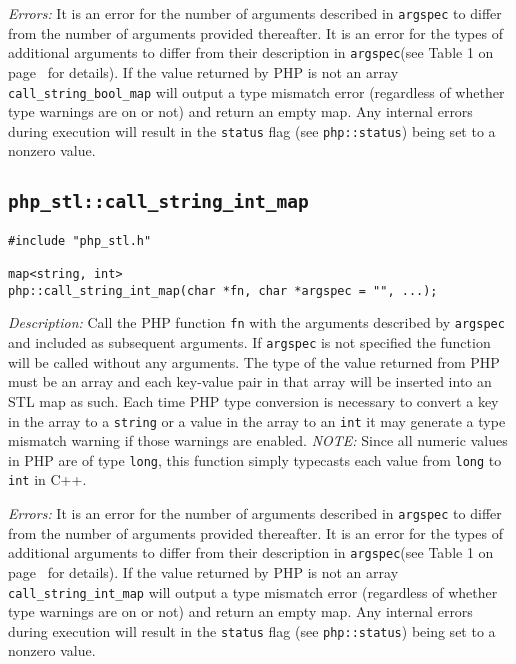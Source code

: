 \documentclass[11pt,titlepage]{article}
\begin{document}
\emph{Errors:} It is an error for the number of arguments described in \verb|argspec| to differ from the number of arguments provided thereafter. It is an error for the types of additional arguments to differ from their description in \verb|argspec|(see Table 1 on page~\pageref{Table1} for details). If the value returned by PHP is not an array \verb|call_string_bool_map| will output a type mismatch error (regardless of whether type warnings are on or not) and return an empty map. Any internal errors during execution will result in the \verb|status| flag (see \verb|php::status|) being set to a nonzero value.


\subsection{\texttt{php\_stl::call\_string\_int\_map}}

\begin{verbatim}
#include "php_stl.h"

map<string, int> 
php::call_string_int_map(char *fn, char *argspec = "", ...);
\end{verbatim}

\emph{Description:} Call the PHP function \verb|fn| with the arguments described by \verb|argspec| and included as subsequent arguments. If \verb|argspec| is not specified the function will be called without any arguments. The type of the value returned from PHP must be an array and each key-value pair in that array will be inserted into an STL map as such. Each time PHP type conversion is necessary to convert a key in the array to a \verb|string| or a value in the array to an \verb|int| it may generate a type mismatch warning if those warnings are enabled. \emph{NOTE:} Since all numeric values in PHP are of type \verb|long|, this function simply typecasts each value from \verb|long| to \verb|int| in C++.

\emph{Errors:} It is an error for the number of arguments described in \verb|argspec| to differ from the number of arguments provided thereafter. It is an error for the types of additional arguments to differ from their description in \verb|argspec|(see Table 1 on page~\pageref{Table1} for details). If the value returned by PHP is not an array \verb|call_string_int_map| will output a type mismatch error (regardless of whether type warnings are on or not) and return an empty map. Any internal errors during execution will result in the \verb|status| flag (see \verb|php::status|) being set to a nonzero value.
\end{document}
